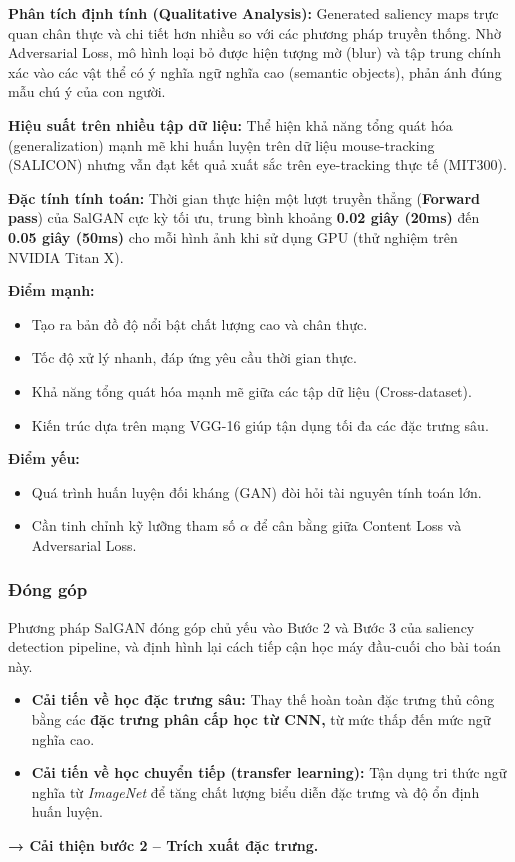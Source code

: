 \textbf{Phân tích định tính (Qualitative Analysis):}  Generated saliency maps trực quan chân thực và chi tiết hơn nhiều so với các phương pháp truyền thống. Nhờ Adversarial Loss, mô hình loại bỏ được hiện tượng mờ (blur) và tập trung chính xác vào các vật thể có ý nghĩa ngữ nghĩa cao (semantic objects), phản ánh đúng mẫu chú ý của con người.

\textbf{Hiệu suất trên nhiều tập dữ liệu:} Thể hiện khả năng tổng quát hóa (generalization) mạnh mẽ khi huấn luyện trên dữ liệu mouse-tracking (SALICON) nhưng vẫn đạt kết quả xuất sắc trên eye-tracking thực tế (MIT300).

\textbf{Đặc tính tính toán:} Thời gian thực hiện một lượt truyền thẳng (\textbf{Forward pass}) của SalGAN cực kỳ tối ưu, trung bình khoảng \textbf{0.02 giây (20ms)} đến \textbf{0.05 giây (50ms)} cho mỗi hình ảnh khi sử dụng GPU (thử nghiệm trên NVIDIA Titan X).

\textbf{Điểm mạnh:} 
\begin{itemize}
    \item Tạo ra bản đồ độ nổi bật chất lượng cao và chân thực.
    \item Tốc độ xử lý nhanh, đáp ứng yêu cầu thời gian thực.
    \item Khả năng tổng quát hóa mạnh mẽ giữa các tập dữ liệu (Cross-dataset).
    \item Kiến trúc dựa trên mạng VGG-16 giúp tận dụng tối đa các đặc trưng sâu.
\end{itemize}

\textbf{Điểm yếu:} 
\begin{itemize}
    \item Quá trình huấn luyện đối kháng (GAN) đòi hỏi tài nguyên tính toán lớn.
    \item Cần tinh chỉnh kỹ lưỡng tham số $\alpha$ để cân bằng giữa Content Loss và Adversarial Loss.
\end{itemize}

\subsubsection{Đóng góp}

Phương pháp SalGAN đóng góp chủ yếu vào Bước 2 và Bước 3 của saliency detection pipeline, và định hình lại cách tiếp cận học máy đầu-cuối cho bài toán này.

\begin{itemize}
    \item \textbf{Cải tiến về học đặc trưng sâu:} Thay thế hoàn toàn đặc trưng thủ công bằng các \textbf{đặc trưng phân cấp học từ CNN,} từ mức thấp đến mức ngữ nghĩa cao.
    \item \textbf{Cải tiến về học chuyển tiếp (transfer learning):} Tận dụng tri thức ngữ nghĩa từ \textit{ImageNet} để tăng chất lượng biểu diễn đặc trưng và độ ổn định huấn luyện. 
\end{itemize}
\textbf{→ Cải thiện bước 2 – Trích xuất đặc trưng.}

